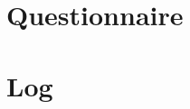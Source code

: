 \documentclass[letterpaper, 11pt]{article}
\title{\deliv{\srs}{Interview}}
\date{\datesrs}
\begin{document}
\maketitle
\tableofcontents
\thispagestyle{fancy}

\begin{flushleft}


\section{Questionnaire}





\section{Log}








\end{flushleft}
\end{document}
